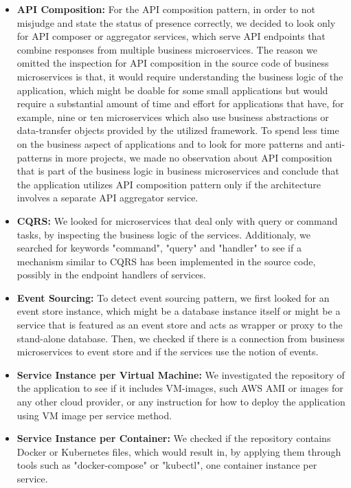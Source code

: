 \documentclass{Configuration_Files/PoliMi3i_thesis}
\begin{document}
\begin{itemize}
\begin{itemize}
        \item \textbf{API Composition:} For the API composition pattern, in order to not misjudge and state the status of presence correctly, we decided to look only for API composer or aggregator services, which serve API endpoints that combine responses from multiple business microservices.
        The reason we omitted the inspection for API composition in the source code of business microservices is that, it would require understanding the business logic of the application, which might be doable for some small applications but would require a substantial amount of time and effort for applications that have, for example, nine or ten microservices which also use business abstractions or data-transfer objects provided by the utilized framework.
        To spend less time on the business aspect of applications and to look for more patterns and anti-patterns in more projects, we made no observation about API composition that is part of the business logic in business microservices and conclude that the application utilizes API composition pattern only if the architecture involves a separate API aggregator service.
        
        \item \textbf{CQRS:} We looked for microservices that deal only with query or command tasks, by inspecting the business logic of the services. 
        Additionaly, we searched for keywords "command", "query" and "handler" to see if a mechanism similar to CQRS has been implemented in the source code, possibly in the endpoint handlers of services.
        
        \item \textbf{Event Sourcing:} To detect event sourcing pattern, we first looked for an event store instance, which might be a database instance itself or might be a service that is featured as an event store and acts as wrapper or proxy to the stand-alone database.
        Then, we checked if there is a connection from business microservices to event store and if the services use the notion of events.
        
        \item \textbf{Service Instance per Virtual Machine:} We investigated the repository of the application to see if it includes VM-images, such AWS AMI or images for any other cloud provider, or any instruction for how to deploy the application using VM image per service method.
        
        \item \textbf{Service Instance per Container:} We checked if the repository contains Docker or Kubernetes files, which would result in, by applying them through tools such as "docker-compose" or "kubectl", one container instance per service.
        

\end{itemize}
\end{itemize}
\end{document}
